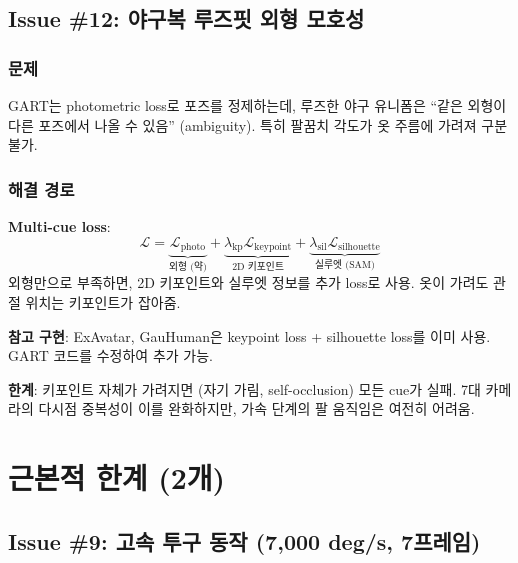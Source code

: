 \documentclass[11pt, a4paper]{report}
\begin{document}
\section{Issue \#12: 야구복 루즈핏 외형 모호성}

\subsection{문제}
GART는 photometric loss로 포즈를 정제하는데, 루즈한 야구 유니폼은 ``같은 외형이 다른 포즈에서 나올 수 있음'' (ambiguity). 특히 팔꿈치 각도가 옷 주름에 가려져 구분 불가.

\subsection{해결 경로}

\begin{mathbox}
\textbf{Multi-cue loss}:
\begin{equation}
\mathcal{L} = \underbrace{\mathcal{L}_\text{photo}}_{\text{외형 (약)}} + \underbrace{\lambda_\text{kp} \mathcal{L}_\text{keypoint}}_{\text{2D 키포인트}} + \underbrace{\lambda_\text{sil} \mathcal{L}_\text{silhouette}}_{\text{실루엣 (SAM)}}
\end{equation}
외형만으로 부족하면, 2D 키포인트와 실루엣 정보를 추가 loss로 사용. 옷이 가려도 관절 위치는 키포인트가 잡아줌.
\end{mathbox}

\begin{ossbox}
\textbf{참고 구현}: ExAvatar, GauHuman은 keypoint loss + silhouette loss를 이미 사용.
GART 코드를 수정하여 추가 가능.
\end{ossbox}

\begin{limitbox}
\textbf{한계}: 키포인트 자체가 가려지면 (자기 가림, self-occlusion) 모든 cue가 실패. 7대 카메라의 다시점 중복성이 이를 완화하지만, 가속 단계의 팔 움직임은 여전히 어려움.
\end{limitbox}


\chapter{근본적 한계 (2개)}
\label{ch:hard}


\section{Issue \#9: 고속 투구 동작 (7,000 deg/s, 7프레임)}
\end{document}
